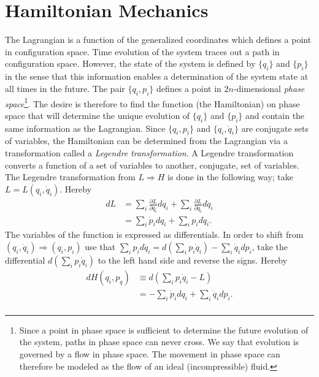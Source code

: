\section{Hamiltonian Mechanics}
The Lagrangian is a function of the generalized coordinates which defines a point in configuration space. Time evolution of the system traces out a path in configuration space. However, the state of the system is defined by $\{q_i\}$ and $\{p_i\}$ in the sense that this information enables a determination of the system state at all times in the future. The pair $\{q_i,p_i\}$ defines a point in $2n$-dimensional \emph{phase space}\footnote{Since a point in phase space is sufficient to determine the future evolution of the system, paths in phase space can never cross. We say that evolution is governed by a flow in phase space. The movement in phase space can therefore be modeled as the flow of an ideal (incompressible) fluid.}. The desire is therefore to find the function (the Hamiltonian) on phase space that will determine the unique evolution of $\{q_i\}$ and $\{p_i\}$ and contain the same information as the Lagrangian. Since $\{q_i,p_i\}$ and $\{q_i,\dot{q}_i\}$ are conjugate sets of variables, the Hamiltonian can be determined from the Lagrangian via a transformation called a \emph{Legendre transformation}. A Legendre transformation converts a function of a set of variables to another, conjugate, set of variables. The Legendre transformation from $L\Rightarrow H$ is done in the following way; take $L=L(q_i,\dot{q}_i)$. Hereby
\begin{equation}
	\begin{split}
		dL&=\sum_i\frac{\partial L}{\partial q_i}dq_i+\sum_i\frac{\partial L}{\partial \dot{q}_i}d\dot{q}_i\\
		&=\sum_i\dot{p}_idq_i+\sum_ip_id\dot{q}_i.
	\end{split}
\end{equation} 
The variables of the function is expressed as differentials. In order to shift from $(q_i,\dot{q}_i)\Rightarrow (q_i,p_i)$ use that $\sum_ip_id\dot{q}_i=d(\sum_ip_i\dot{q}_i)-\sum_i\dot{q}_idp_i$, take the differential $d(\sum_ip_i\dot{q}_i)$ to the left hand side and reverse the signs. Hereby
\begin{equation}
	\begin{split}
		dH(q_i,p_q)&\equiv d(\sum_ip_i\dot{q}_i-L)\\
		&=-\sum_i\dot{p}_idq_i+\sum_i\dot{q}_idp_i.\\
	\end{split}
	\label{ham}
\end{equation} 
